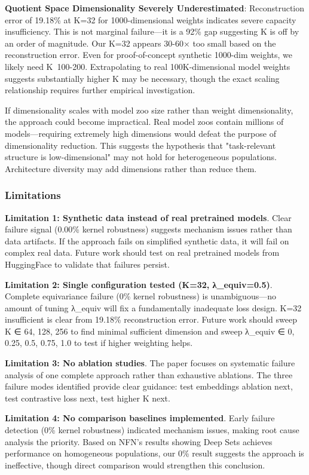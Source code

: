 \textbf{Quotient Space Dimensionality Severely Underestimated}: Reconstruction error of 19.18\% at K=32 for 1000-dimensional weights indicates severe capacity insufficiency. This is not marginal failure—it is a 92\% gap suggesting K is off by an order of magnitude. Our K=32 appears 30-60× too small based on the reconstruction error. Even for proof-of-concept synthetic 1000-dim weights, we likely need K~100-200. Extrapolating to real 100K-dimensional model weights suggests substantially higher K may be necessary, though the exact scaling relationship requires further empirical investigation.

If dimensionality scales with model zoo size rather than weight dimensionality, the approach could become impractical. Real model zoos contain millions of models—requiring extremely high dimensions would defeat the purpose of dimensionality reduction. This suggests the hypothesis that "task-relevant structure is low-dimensional" may not hold for heterogeneous populations. Architecture diversity may add dimensions rather than reduce them.

\subsubsection{Limitations}

\textbf{Limitation 1: Synthetic data instead of real pretrained models}. Clear failure signal (0.00\% kernel robustness) suggests mechanism issues rather than data artifacts. If the approach fails on simplified synthetic data, it will fail on complex real data. Future work should test on real pretrained models from HuggingFace to validate that failures persist.

\textbf{Limitation 2: Single configuration tested (K=32, λ_equiv=0.5)}. Complete equivariance failure (0\% kernel robustness) is unambiguous—no amount of tuning λ_equiv will fix a fundamentally inadequate loss design. K=32 insufficient is clear from 19.18\% reconstruction error. Future work should sweep K ∈ {64, 128, 256} to find minimal sufficient dimension and sweep λ_equiv ∈ {0, 0.25, 0.5, 0.75, 1.0} to test if higher weighting helps.

\textbf{Limitation 3: No ablation studies}. The paper focuses on systematic failure analysis of one complete approach rather than exhaustive ablations. The three failure modes identified provide clear guidance: test embeddings ablation next, test contrastive loss next, test higher K next.

\textbf{Limitation 4: No comparison baselines implemented}. Early failure detection (0\% kernel robustness) indicated mechanism issues, making root cause analysis the priority. Based on NFN's results showing Deep Sets achieves performance on homogeneous populations, our 0\% result suggests the approach is ineffective, though direct comparison would strengthen this conclusion.

